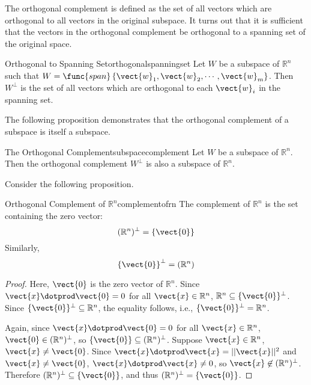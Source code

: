 The orthogonal complement is defined as the set of all vectors which are orthogonal to all vectors in the original subspace. It turns out that it is sufficient that the vectors in the orthogonal complement be orthogonal to a spanning set of the original space.

\begin{proposition}{Orthogonal to Spanning Set}{orthogonalspanningset}
Let $W$ be a subspace of $\mathbb{R}^n$ such that $W = \func{span} \left\{ \vect{w}_1, \vect{w}_2, \cdots, \vect{w}_m \right\}$. Then $W^{\perp}$ is the set of all vectors which are orthogonal to each $\vect{w}_i$ in the spanning set. 
\end{proposition}

The following proposition demonstrates that the orthogonal complement of a subspace is itself a subspace. 

\begin{proposition}{The Orthogonal Complement}{subspacecomplement}
Let $W$ be a subspace of $\mathbb{R}^n$. Then the orthogonal complement $W^{\perp}$ is also a subspace of $\mathbb{R}^n$.
\end{proposition}

Consider the following proposition.

\begin{proposition}{Orthogonal Complement of $\mathbb{R}^n$}{complementofrn}
The complement of $\mathbb{R}^n$ is the set containing the zero vector:
\[
 (\mathbb{R}^n)^{\perp} = \left\{ \vect{0} \right\}
\]
Similarly, 
\[
\left\{ \vect{0} \right\}^{\perp} = (\mathbb{R}^n)
\]
\end{proposition}

\begin{proof}
Here, $\vect{0}$ is the zero vector of $\mathbb{R}^n$.
Since $\vect{x}\dotprod\vect{0}=0$ for all $\vect{x}\in\mathbb{R}^n$, 
$\mathbb{R}^n\subseteq\{ \vect{0}\}^{\perp}$.
Since $\{ \vect{0}\}^{\perp}\subseteq\mathbb{R}^n$, the equality follows,
i.e., $\{ \vect{0}\}^{\perp}=\mathbb{R}^n$.

Again, since $\vect{x}\dotprod\vect{0}=0$ for all $\vect{x}\in\mathbb{R}^n$,
$\vect{0}\in (\mathbb{R}^n)^{\perp}$, so $\{ \vect{0}\}\subseteq(\mathbb{R}^n)^{\perp}$.
Suppose $\vect{x}\in\mathbb{R}^n$, $\vect{x}\neq\vect{0}$.  
Since $\vect{x}\dotprod\vect{x}=||\vect{x}||^2$ and $\vect{x}\neq\vect{0}$,
$\vect{x}\dotprod\vect{x}\neq 0$, so $\vect{x}\not\in(\mathbb{R}^n)^{\perp}$.
Therefore $(\mathbb{R}^n)^{\perp}\subseteq \{\vect{0}\}$, and thus
$(\mathbb{R}^n)^{\perp}=\{\vect{0}\}$.
\end{proof}

